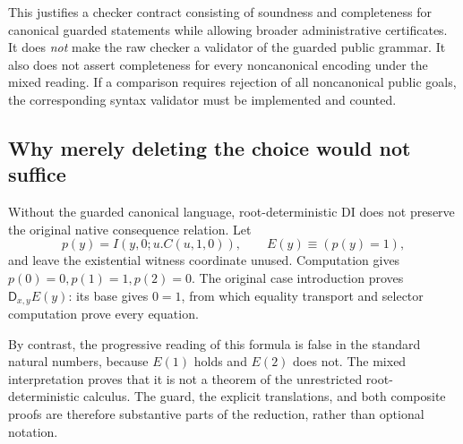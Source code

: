 This justifies a checker contract consisting of soundness and
completeness for canonical guarded statements while allowing broader
administrative certificates.  It does \emph{not} make the raw checker
a validator of the guarded public grammar.  It also does not assert
completeness for every noncanonical encoding under the mixed reading.
If a comparison requires rejection of all noncanonical public goals,
the corresponding syntax validator must be implemented and counted.

\subsection{Why merely deleting the choice would not suffice}

Without the guarded canonical language, root-deterministic DI does
not preserve the original native consequence relation.  Let
\[
 p(y)=I(y,0;u.C(u,1,0)),\qquad E(y)\equiv(p(y)=1),
\]
and leave the existential witness coordinate unused.  Computation
gives $p(0)=0,p(1)=1,p(2)=0$.  The original case introduction proves
$\mathsf D_{x,y}E(y)$: its base gives $0=1$, from which equality
transport and selector computation prove every equation.

By contrast, the progressive reading of this formula is false in the
standard natural numbers, because $E(1)$ holds and $E(2)$ does not.
The mixed interpretation proves that it is not a theorem of the
unrestricted root-deterministic calculus.  The guard, the explicit
translations, and both composite proofs are therefore substantive
parts of the reduction, rather than optional notation.
